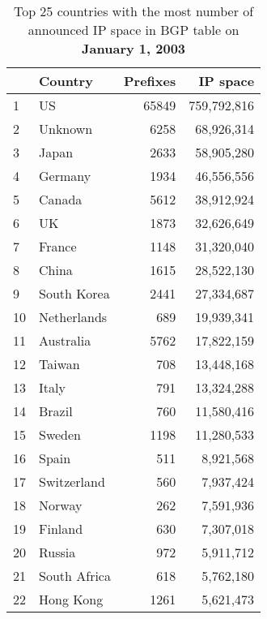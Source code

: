 \begin{table*}[p]
\begin{minipage}[t]{0.48\textwidth}
	\begin{center}
	\caption{Top 25 countries with the most number of announced IP space in BGP table on \textbf{January 1, 2003}}
	\label{tab:top25 bgp ip space 2003}
	\begin{tabular}{|l||l|r|r|}
		\hline
		&      \bf Country		&    Prefixes   &       IP space 		\tabularnewline \hline 
1       &       US      		&       65849   &       759,792,816     \tabularnewline \hline
2       &       Unknown		   	&       6258    &       68,926,314      \tabularnewline \hline
3       &       Japan   		&       2633    &       58,905,280      \tabularnewline \hline
4       &       Germany 		&       1934    &       46,556,556      \tabularnewline \hline
5       &       Canada  		&       5612    &       38,912,924      \tabularnewline \hline
6       &       UK      		&       1873    &       32,626,649      \tabularnewline \hline
7       &       France  		&       1148    &       31,320,040      \tabularnewline \hline
8       &       China   		&       1615    &       28,522,130      \tabularnewline \hline
9       &       South Korea     &       2441    &       27,334,687      \tabularnewline \hline
10      &       Netherlands     &       689     &       19,939,341      \tabularnewline \hline
11      &       Australia       &       5762    &       17,822,159      \tabularnewline \hline
12      &       Taiwan  		&       708     &       13,448,168      \tabularnewline \hline
13      &       Italy   		&       791     &       13,324,288      \tabularnewline \hline
14      &       Brazil  		&       760     &       11,580,416      \tabularnewline \hline
15      &       Sweden  		&       1198    &       11,280,533      \tabularnewline \hline
16      &       Spain   		&       511     &       8,921,568       \tabularnewline \hline
17      &       Switzerland     &       560     &       7,937,424       \tabularnewline \hline
18      &       Norway  		&       262     &       7,591,936       \tabularnewline \hline
19      &       Finland 		&       630     &       7,307,018       \tabularnewline \hline
20      &       Russia  		&       972     &       5,911,712       \tabularnewline \hline
21      &       South Africa    &       618     &       5,762,180       \tabularnewline \hline
22      &       Hong Kong       &       1261    &       5,621,473       \tabularnewline \hline

\end{tabular}
\end{center}
\end{minipage}
\end{table*}
